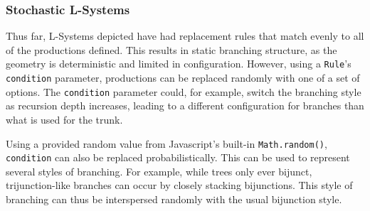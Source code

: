 \documentclass{article}
\newcommand{\tab}{\hspace*{2em}}
\begin{document}
            \subsubsection{Stochastic L-Systems}
    \tab Thus far, L-Systems depicted have had replacement rules that match evenly to all of the
productions defined. This results in static branching structure, as the geometry is deterministic
and limited in configuration. However, using a \verb|Rule|'s \verb|condition| parameter,
productions can be replaced randomly with one of a set of options. The \verb|condition| parameter
could, for example, switch the branching style as recursion depth increases, leading to a different
configuration for branches than what is used for the trunk.

    \tab Using a provided random value from Javascript's built-in \verb|Math.random()|,
\verb|condition| can also be replaced probabilistically. This can be used to represent several
styles of branching. For example, while trees only ever bijunct, trijunction-like branches can
occur by closely stacking bijunctions. This style of branching can thus be interspersed randomly
with the usual bijunction style.
\end{document}
